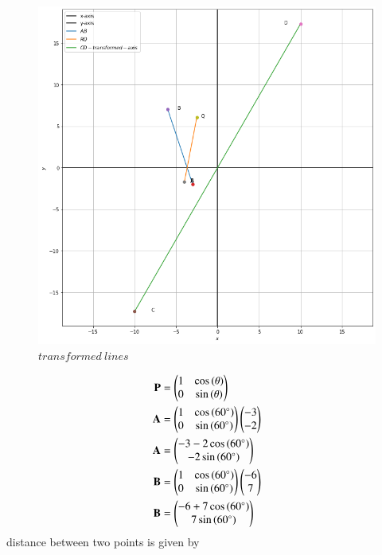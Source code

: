 \documentclass[journal,12pt,twocolumn]{IEEEtran}
\begin{document}
\begin{figure}[!h]
\includegraphics[width=\columnwidth]{Dis btw two points.png}
\caption{$transformed \ lines$}
\label{fig:straight lines}	
\end{figure}
\begin{align}
\mathbf{P} &=\begin{pmatrix}1 & \cos{(\theta)}\\ 0 & \sin{(\theta)}\end{pmatrix}\\
\mathbf{A} &=\begin{pmatrix}1 & \cos{(\ang{60} )}\\ 0 & \sin{(\ang{60} )}\end{pmatrix} \begin{pmatrix}-3 \\ -2\end{pmatrix}\\
\mathbf{A} &=\begin{pmatrix}-3 -2\cos{(\ang{60} )}\\  -2\sin{(\ang{60} )}\end{pmatrix} \\
\mathbf{B} &=\begin{pmatrix}1 & \cos{(\ang{60} )}\\ 0 & \sin{(\ang{60} )}\end{pmatrix} \begin{pmatrix}-6 \\ 7\end{pmatrix}\\
\mathbf{B} &=\begin{pmatrix}-6 +7\cos{(\ang{60} )}\\  7\sin{(\ang{60} )}\end{pmatrix} 
\end{align}
distance between two points is given by
\end{document}
